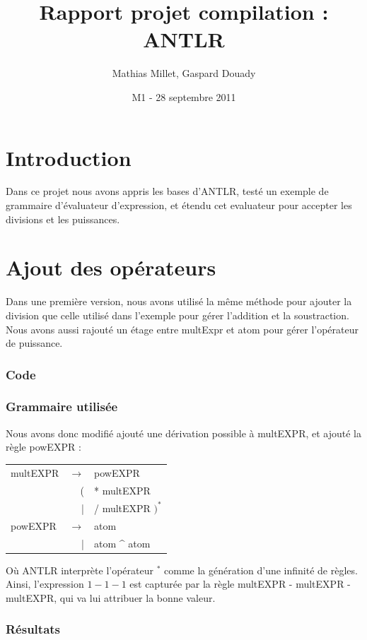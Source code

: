 \documentclass[11pt,a4paper]{article}
\title{Rapport projet compilation : ANTLR}
\author{Mathias Millet, Gaspard Douady}
\date{M1 - 28 septembre 2011}
\begin{document}
\maketitle
\newpage

\part*{Introduction}
Dans ce projet nous avons appris les bases d'ANTLR, testé un exemple de grammaire d'évaluateur d'expression, et étendu cet evaluateur pour accepter les divisions et les puissances.

\part{Ajout des opérateurs}
Dans une première version, nous avons utilisé la même méthode pour ajouter la division que celle utilisé dans l'exemple pour gérer l'addition et la soustraction.\\
Nous avons aussi rajouté un étage entre multExpr et atom pour gérer l'opérateur de puissance.

	\section{Code}\begin{scriptsize}
	\end{scriptsize}
	
	\section{Grammaire utilisée}
		Nous avons donc modifié ajouté une dérivation possible à multEXPR, et ajouté la règle powEXPR :  
		\begin{center}
		 \begin{tabular}{lrl}
			multEXPR & $\longrightarrow$ & powEXPR\\
 					& ( &   * multEXPR\\
 					& | & / multEXPR $)^*$\\
			powEXPR & $\longrightarrow$ & atom  \\
					& | & atom \^{} atom
	\end{tabular}\end{center}
	Où ANTLR interprète l'opérateur $^*$ comme la génération d'une infinité de règles. Ainsi, l'expression $1-1-1$ est capturée par la règle multEXPR - multEXPR - multEXPR, qui va lui attribuer la bonne valeur.
	\section{Résultats}
\end{document}
